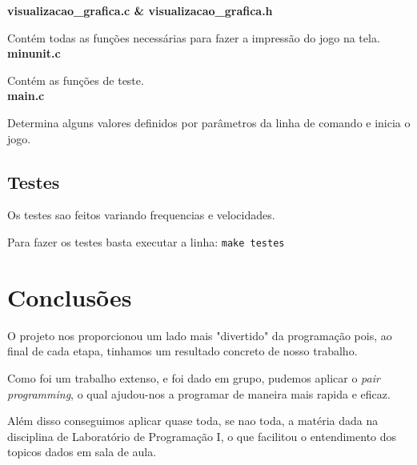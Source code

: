 \documentclass[12pt,a4paper]{article}
\begin{document}
\textbf{visualizacao\_grafica.c \& visualizacao\_grafica.h}

Contém todas as funções necessárias para fazer a impressão do jogo na tela.\\

\textbf{minunit.c}

Contém as funções de teste.\\

\textbf{main.c}

Determina alguns valores definidos por parâmetros da linha de comando e inicia o jogo.\\


\subsection{Testes}
Os testes sao feitos variando frequencias e velocidades.

Para fazer os testes basta executar a linha:
\verb|make testes|


\section{Conclusões}

O projeto nos proporcionou um lado mais "divertido"  da programação pois, ao final de cada etapa, tinhamos um resultado
concreto de nosso trabalho.

Como foi um trabalho extenso, e foi dado em grupo, pudemos aplicar o \emph{pair programming}, o qual ajudou-nos a programar
de maneira mais rapida e eficaz.

Além disso conseguimos aplicar quase toda, se nao toda, a matéria dada na disciplina de Laboratório de Programação I,
o que facilitou o entendimento dos topicos dados em sala de aula.
\end{document}
